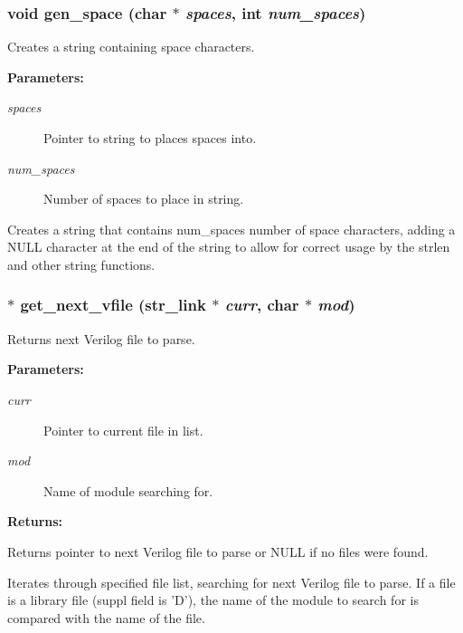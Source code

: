 \subsubsection{\setlength{\rightskip}{0pt plus 5cm}void gen\_\-space (char $\ast$ {\em spaces}, int {\em num\_\-spaces})}\label{util_8h_a15}


Creates a string containing space characters.

\begin{Desc}
\item[{\bf Parameters: }]\par
\begin{description}
\item[
{\em spaces}]Pointer to string to places spaces into. \item[
{\em num\_\-spaces}]Number of spaces to place in string.

\end{description}
\end{Desc}
Creates a string that contains num\_\-spaces number of space characters, adding a NULL character at the end of the string to allow for correct usage by the strlen and other string functions. 
\subsubsection{$\ast$ get\_\-next\_\-vfile ({\bf str\_\-link} $\ast$ {\em curr}, char $\ast$ {\em mod})}\label{util_8h_a12}


Returns next Verilog file to parse.

\begin{Desc}
\item[{\bf Parameters: }]\par
\begin{description}
\item[
{\em curr}]Pointer to current file in list. \item[
{\em mod}]Name of module searching for.

\end{description}
\end{Desc}
\begin{Desc}
\item[{\bf Returns: }]\par
Returns pointer to next Verilog file to parse or NULL if no files were found.

\end{Desc}
Iterates through specified file list, searching for next Verilog file to parse. If a file is a library file (suppl field is 'D'), the name of the module to search for is compared with the name of the file. 
